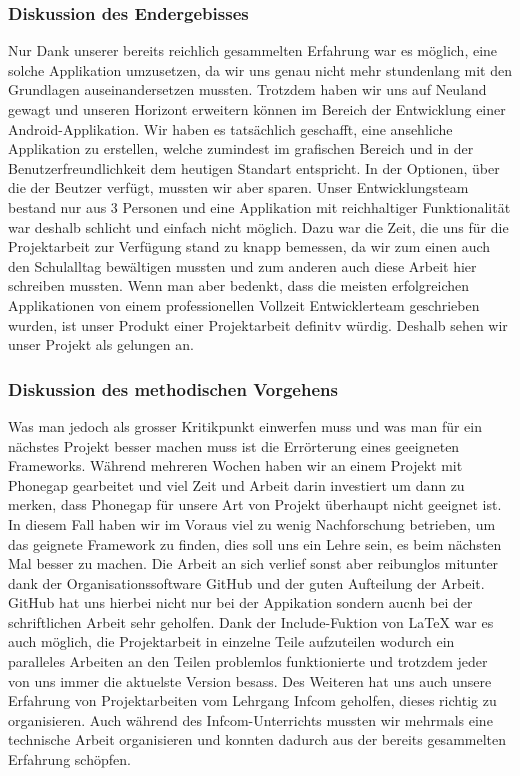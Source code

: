 \subsubsection{Diskussion des Endergebisses}
Nur Dank unserer bereits reichlich gesammelten Erfahrung war es möglich, eine solche Applikation umzusetzen, da wir uns genau nicht mehr stundenlang mit den Grundlagen auseinandersetzen mussten. Trotzdem haben wir uns auf Neuland gewagt und unseren Horizont erweitern können im Bereich der Entwicklung einer Android-Applikation. Wir haben es tatsächlich geschafft, eine ansehliche Applikation zu erstellen, welche zumindest im grafischen Bereich und in der Benutzerfreundlichkeit dem heutigen Standart entspricht. In der Optionen, über die der Beutzer verfügt, mussten wir aber sparen. Unser Entwicklungsteam bestand nur aus 3 Personen und eine Applikation mit reichhaltiger Funktionalität war deshalb schlicht und einfach nicht möglich. Dazu war die Zeit, die uns für die Projektarbeit zur Verfügung stand zu knapp bemessen, da wir zum einen auch den Schulalltag bewältigen mussten und zum anderen auch diese Arbeit hier schreiben mussten. Wenn man aber bedenkt, dass die meisten erfolgreichen Applikationen von einem professionellen Vollzeit Entwicklerteam geschrieben wurden, ist unser Produkt einer Projektarbeit definitv würdig. Deshalb sehen wir unser Projekt als gelungen an. 
\subsubsection{Diskussion des methodischen Vorgehens}
Was man jedoch als grosser Kritikpunkt einwerfen muss und was man für ein nächstes Projekt besser machen muss ist die Errörterung eines geeigneten Frameworks. Während mehreren Wochen haben wir an einem Projekt mit Phonegap gearbeitet und viel Zeit und Arbeit darin investiert um dann zu merken, dass Phonegap für unsere Art von Projekt überhaupt nicht geeignet ist. In diesem Fall haben wir im Voraus viel zu wenig Nachforschung betrieben, um das geignete Framework zu finden, dies soll uns ein Lehre sein, es beim nächsten Mal besser zu machen. Die Arbeit an sich verlief sonst aber reibunglos mitunter dank der Organisationssoftware GitHub und der guten Aufteilung der Arbeit. GitHub hat uns hierbei nicht nur bei der Appikation sondern aucnh bei der schriftlichen Arbeit sehr geholfen. Dank der Include-Fuktion von LaTeX war es auch möglich, die Projektarbeit in einzelne Teile aufzuteilen wodurch ein paralleles Arbeiten an den Teilen problemlos funktionierte und trotzdem jeder von uns immer die aktuelste Version besass. Des Weiteren hat uns auch unsere Erfahrung von Projektarbeiten vom Lehrgang Infcom geholfen, dieses richtig zu organisieren. Auch während des Infcom-Unterrichts mussten wir mehrmals eine technische Arbeit organisieren und konnten dadurch aus der bereits gesammelten Erfahrung schöpfen.
